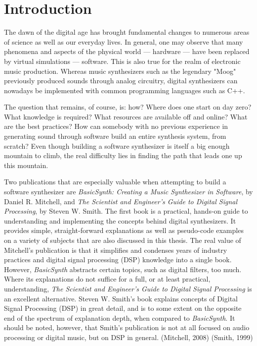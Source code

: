 \chapter*{Introduction}

The dawn of the digital age has brought fundamental changes to numerous areas of science as well as our everyday lives. In general, one may observe that many phenomena and aspects of the physical world --- hardware --- have been replaced by virtual simulations --- software. This is also true for the realm of electronic music production. Whereas music synthesizers such as the legendary "Moog" previously produced sounds through analog circuitry, digital synthesizers can nowadays be implemented with common programming languages such as C++.\bigskip

\noindent The question that remains, of course, is: how? Where does one start on day zero? What knowledge is required? What resources are available off and online? What are the best practices? How can somebody with no previous experience in generating sound through software build an entire synthesis system, from scratch? Even though building a software synthesizer is itself a big enough mountain to climb, the real difficulty lies in finding the path that leads one up this mountain. \bigskip

\noindent Two publications that are especially valuable when attempting to build a software synthesizer are \emph{BasicSynth: Creating a Music Synthesizer in Software}, by Daniel R. Mitchell, and \emph{The Scientist and Engineer's Guide to Digital Signal Processing}, by Steven W. Smith. The first book is a practical, hands-on guide to understanding and implementing the concepts behind digital synthesizers. It provides simple, straight-forward explanations as well as pseudo-code examples on a variety of subjects that are also discussed in this thesis. The real value of Mitchell's publication is that it simplifies and condenses years of industry practices and digital signal processing (DSP) knowledge into a single book. However, \emph{BasicSynth} abstracts certain topics, such as digital filters, too much. Where its explanations do not suffice for a full, or at least practical, understanding, \emph{The Scientist and Engineer's Guide to Digital Signal Processing} is an excellent alternative. Steven W. Smith's book explains concepts of Digital Signal Processing (DSP) in great detail, and is to some extent on the opposite end of the spectrum of explanation depth, when compared to \emph{BasicSynth}. It should be noted, however, that Smith's publication is not at all focused on audio processing or digital music, but on DSP in general. (Mitchell, 2008) (Smith, 1999)\bigskip

